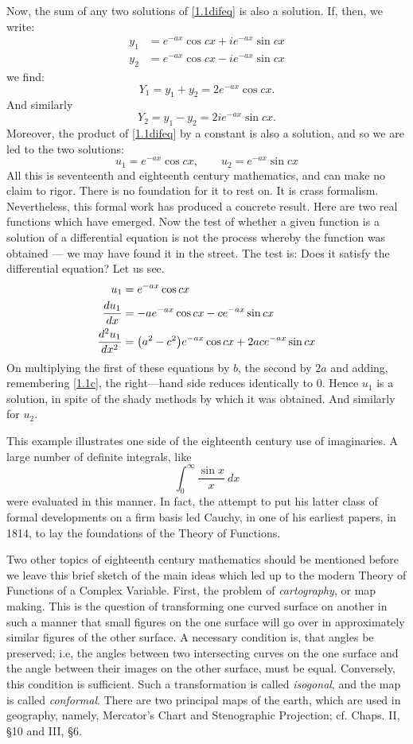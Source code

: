 Now, the sum of any two solutions of \ref{1.1difeq} is also a solution. If, then, we write:
\begin{align*}
	y_1&=e^{-ax}\cos cx+ie^{-ax}\sin cx\\
	y_2&=e^{-ax}\cos cx-ie^{-ax}\sin cx
\end{align*} we find:
\[
Y_1=y_1+y_2=2e^{-ax}\cos cx
.\] And similarly 
\[
Y_2=y_1-y_2=2ie^{-ax}\sin cx
.\] Moreover, the product of \ref{1.1difeq} by a constant is also a solution, and so we are led to the two solutions:
\begin{equation}
u_1=e^{-ax}\cos cx, \qquad u_2=e^{-ax}\sin cx
\end{equation} 
All this is seventeenth and eighteenth century mathematics, and can make no claim to rigor. There is no foundation for it to rest on. It is crass formalism. Nevertheless, this formal work has produced a concrete result. Here are two real functions which have emerged. Now the test of whether a given function is a solution of a differential equation is not the process whereby the function was obtained --- we may have found it in the street. The test is: Does it satisfy the differential equation? Let us see.
\begin{align*}
	u_1&=e^{-ax}\cos cx\\
	\frac{du_1}{dx} &=-ae^{-ax}\cos cx-ce^{-ax}\sin cx\\
	\frac{d^2u_1}{dx^2} &=\pbr*{a^2-c^2} e^{-ax}\cos cx+2ace^{-ax}\sin cx
\end{align*} On multiplying the first of these equations by $b$, the second by $2a$ and adding, remembering \ref{1.1c}, the right---hand side reduces identically to $0$. Hence $u_1$ is a solution, in spite of the shady methods by which it was obtained. And similarly for $u_2$. 

This example illustrates one side of the eighteenth century use of imaginaries. A large number of definite integrals, like 
\[
\int _0^\infty \frac{\sin x}{x}  \: dx 
\] were evaluated in this manner. In fact, the attempt to put his latter class of formal developments on a firm basis led Cauchy, in one of his earliest papers, in 1814, to lay the foundations of the Theory of Functions.

Two other topics of eighteenth century mathematics should be mentioned before we leave this brief sketch of the main ideas which led up to the modern Theory of Functions of a Complex Variable. First, the problem of \emph{cartography}, or map making. This is the question of transforming one curved surface on another in such a manner that small figures on the one surface will go over in approximately similar figures of the other surface. A necessary condition is, that angles be preserved; i.e, the angles between two intersecting curves on the one surface and the angle between their images on the other surface, must be equal. Conversely, this condition is sufficient. Such a transformation is called \emph{isogonal}, and the map is called \emph{conformal}. There are two principal maps of the earth, which are used in geography, namely, Mercator's Chart and Stenographic Projection; cf. Chaps. II, \S 10 and III, \S 6. 

